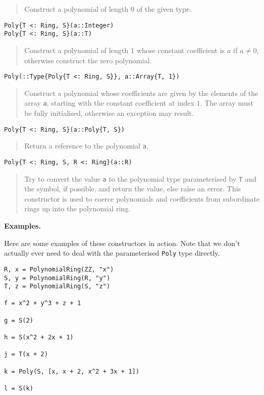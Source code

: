 \documentclass[a4paper,10pt]{article}
\newcommand{\code}{\lstinline}
\newcommand{\desc}[1]{\vspace{-3mm}\begin{quote}#1\end{quote}}
\begin{document}
{{{\desc{Construct a polynomial of length $0$ of the given type.}

\begin{lstlisting}
Poly{T <: Ring, S}(a::Integer)
Poly{T <: Ring, S}(a::T)
\end{lstlisting}

\desc{Construct a polynomial of length $1$ whose constant coefficient is $a$ if
$a \neq 0$, otherwise construct the zero polynomial.}

\begin{lstlisting}
Poly(::Type{Poly{T <: Ring, S}}, a::Array{T, 1})
\end{lstlisting}

\desc{Construct a polynomial whose coefficients are given by the elements of the array
\code{a}, starting with the constant coefficient at index $1$. The array must be fully
initialised, otherwise an exception may result.}

\begin{lstlisting}
Poly{T <: Ring, S}(a::Poly{T, S})
\end{lstlisting}

\desc{Return a reference to the polynomial \code{a}.}

\begin{lstlisting}
Poly{T <: Ring, S, R <: Ring}(a::R)
\end{lstlisting}

\desc{Try to convert the value \code{a} to the polynomial type parameterised by 
\code{T} and the symbol, if possible, and return the value, else raise an error. 
This constructor is used to coerce polynomials and coefficients from subordinate rings up
into the polynomial ring.}

\textbf{Examples.}

Here are some examples of these constructors in action. Note that we don't actually
ever need to deal with the parameterised \code{Poly} type directly.

\begin{lstlisting}
R, x = PolynomialRing(ZZ, "x")
S, y = PolynomialRing(R, "y")
T, z = PolynomialRing(S, "z")

f = x^2 + y^3 + z + 1

g = S(2)

h = S(x^2 + 2x + 1)

j = T(x + 2)

k = Poly(S, [x, x + 2, x^2 + 3x + 1])

l = S(k)
\end{lstlisting}

}}}
\end{document}
